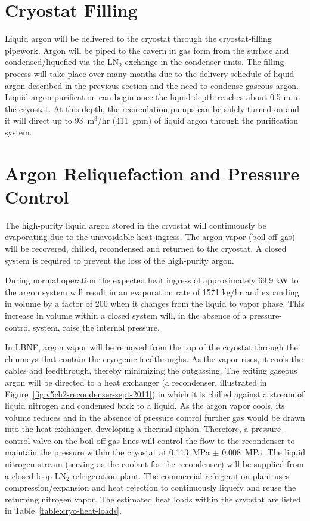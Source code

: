 \section{Cryostat Filling}

Liquid argon will be delivered to the cryostat through the 
cryostat-filling pipework. Argon will be piped to the cavern 
in gas form from the surface and condensed/liquefied via the 
LN$_{2}$ exchange in the condenser units. The filling process 
will take place over many months due to the delivery schedule 
of liquid argon described in the previous section and the 
need to condense gaseous argon. Liquid-argon purification 
can begin once the liquid depth reaches about 0.5 m in the cryostat. 
At this depth, the recirculation pumps can be safely
turned on and it will direct up to 93~m$^{3}$/hr (411~gpm) 
of liquid argon through the purification system.

\section{Argon Reliquefaction and Pressure Control}
\label{subsec:reliquef}

The high-purity liquid argon stored in the cryostat will 
continuously be evaporating due to the unavoidable heat ingress.  
The argon vapor (boil-off gas) will be recovered, chilled, 
recondensed and returned to the cryostat. A closed system 
is required to prevent the loss of the high-purity argon.

During normal operation the expected heat ingress of approximately 
69.9 kW to the argon system will result in 
an evaporation rate of 1571 kg/hr and expanding in volume by a 
factor of 200 when it changes from the liquid to vapor phase. 
This increase in volume within a closed system will, in the 
absence of a pressure-control system, raise the internal pressure.

In LBNF, argon vapor will be removed from the top of the cryostat 
through the chimneys that contain the cryogenic feedthroughs. As 
the vapor rises, it cools the cables and feedthrough, thereby 
minimizing the outgassing. The exiting gaseous argon will be 
directed to a heat exchanger (a recondenser, illustrated in 
Figure~\ref{fig:v5ch2-recondenser-sept-2011}) in which it is 
chilled against a stream of liquid nitrogen and condensed 
back to a liquid. As the argon vapor cools, its volume 
reduces and in the absence of pressure control further 
gas would be drawn into the heat exchanger, developing 
a thermal siphon.  Therefore, a pressure-control valve on 
the boil-off gas lines will control the flow to the recondenser 
to maintain the pressure within the cryostat at 0.113~MPa $\pm$ 0.008~MPa.  
The liquid nitrogen stream (serving as the coolant for the 
recondenser) will be supplied from a closed-loop LN$_{2}$ refrigeration plant.  
The commercial refrigeration plant uses compression/expansion and heat 
rejection to continuously liquefy and reuse the returning nitrogen 
vapor. The estimated heat loads within the cryostat are listed 
in Table~\ref{table:cryo-heat-loads}.
 
